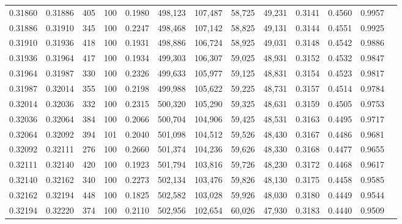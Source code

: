 \begin{tabular}{rrrrrrrrrrrrr}
0.31860 & 0.31886 &   405 & 100 &                                     0.1980 & 498,123 & 107,487 &  58,725 &  49,231 & 0.3141 & 0.4560 & 0.9957 \\
0.31886 & 0.31910 &   345 & 100 &                                     0.2247 & 498,468 & 107,142 &  58,825 &  49,131 & 0.3144 & 0.4551 & 0.9925 \\
0.31910 & 0.31936 &   418 & 100 &                                     0.1931 & 498,886 & 106,724 &  58,925 &  49,031 & 0.3148 & 0.4542 & 0.9886 \\
0.31936 & 0.31964 &   417 & 100 &                                     0.1934 & 499,303 & 106,307 &  59,025 &  48,931 & 0.3152 & 0.4532 & 0.9847 \\
0.31964 & 0.31987 &   330 & 100 &                                     0.2326 & 499,633 & 105,977 &  59,125 &  48,831 & 0.3154 & 0.4523 & 0.9817 \\
0.31987 & 0.32014 &   355 & 100 &                                     0.2198 & 499,988 & 105,622 &  59,225 &  48,731 & 0.3157 & 0.4514 & 0.9784 \\
0.32014 & 0.32036 &   332 & 100 &                                     0.2315 & 500,320 & 105,290 &  59,325 &  48,631 & 0.3159 & 0.4505 & 0.9753 \\
0.32036 & 0.32064 &   384 & 100 &                                     0.2066 & 500,704 & 104,906 &  59,425 &  48,531 & 0.3163 & 0.4495 & 0.9717 \\
0.32064 & 0.32092 &   394 & 101 &                                     0.2040 & 501,098 & 104,512 &  59,526 &  48,430 & 0.3167 & 0.4486 & 0.9681 \\
0.32092 & 0.32111 &   276 & 100 &                                     0.2660 & 501,374 & 104,236 &  59,626 &  48,330 & 0.3168 & 0.4477 & 0.9655 \\
0.32111 & 0.32140 &   420 & 100 &                                     0.1923 & 501,794 & 103,816 &  59,726 &  48,230 & 0.3172 & 0.4468 & 0.9617 \\
0.32140 & 0.32162 &   340 & 100 &                                     0.2273 & 502,134 & 103,476 &  59,826 &  48,130 & 0.3175 & 0.4458 & 0.9585 \\
0.32162 & 0.32194 &   448 & 100 &                                     0.1825 & 502,582 & 103,028 &  59,926 &  48,030 & 0.3180 & 0.4449 & 0.9544 \\
0.32194 & 0.32220 &   374 & 100 &                                     0.2110 & 502,956 & 102,654 &  60,026 &  47,930 & 0.3183 & 0.4440 & 0.9509 \\

\end{tabular}

